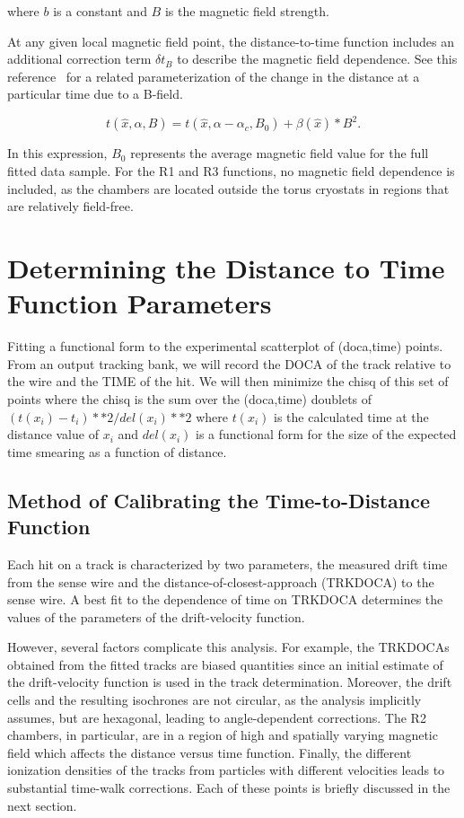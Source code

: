 \documentclass{article}
\begin{document}
\noindent
where $b$ is a constant and $B$ is the magnetic field strength.

At any given local magnetic field point, the distance-to-time function 
includes an additional correction term $\delta t_B$ to describe 
the magnetic field dependence.  See this reference~\cite{qin96} for a related
parameterization of the change in the distance at a particular time due to a
B-field. 

\begin{equation}
\label{XTB}
t(\hat{x},\alpha,B) = t(\hat{x},\alpha-\alpha_c,B_0) +  \beta(\hat{x})*B^2.
\end{equation}

\noindent
In this expression, $B_0$ represents the average magnetic field value for the 
full fitted data sample.  For the R1 and R3 functions, no magnetic field 
dependence is included, as the chambers are located outside the torus 
cryostats in regions that are relatively field-free.





\section{Determining the Distance to Time Function Parameters}
Fitting a functional form to the experimental scatterplot of (doca,time) points.
From an output tracking bank, we will record the DOCA of the track relative to the
wire and the TIME of the hit.  We will then minimize the chisq of this set of points where
the chisq is the sum over the (doca,time) doublets of $(t(x_i) - t_i)**2 / del(x_i)**2$
where $t(x_i)$ is the calculated time at the distance value of $x_i$ and $del(x_i)$ is a functional
form for the size of the expected time smearing as a function of distance.

\subsection{Method of Calibrating the Time-to-Distance Function}
\label{tdistcal}

Each hit on a track is characterized by two parameters, the measured drift 
time from the sense wire and the distance-of-closest-approach (TRKDOCA) to the 
sense wire.  A best fit to the dependence of time on TRKDOCA determines the
values of the parameters of the drift-velocity function. 

However, several factors 
complicate this analysis. For example, the TRKDOCAs obtained from the fitted 
tracks are biased quantities since an initial estimate of the drift-velocity 
function is used in the track determination.  Moreover, the drift cells and
the resulting isochrones are 
not circular, as the analysis implicitly assumes, but are hexagonal, leading 
to angle-dependent corrections.   The R2 chambers, in particular, are in a 
region of high and spatially varying magnetic field which affects the distance
versus time function.  Finally, the different 
ionization densities of the tracks from particles with different velocities 
leads to substantial time-walk corrections.  Each of 
these points is briefly discussed in the next section.
\end{document}
